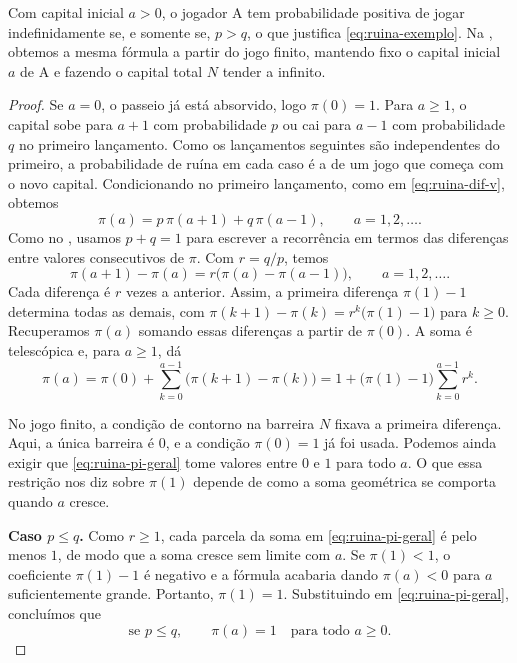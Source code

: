 \documentclass[12pt,portuguese]{article}
\theoremstyle{definition}
\theoremstyle{plainexercise}
\theoremstyle{starredexercise}
\theoremstyle{definition}
\begin{document}
Com capital inicial $a > 0$, o jogador A tem probabilidade positiva de jogar
indefinidamente se, e somente se, $p > q$, o que justifica \eqref{eq:ruina-exemplo}.
Na , obtemos a mesma fórmula a partir do jogo finito,
mantendo fixo o capital inicial $a$ de A e fazendo o capital total $N$ tender
a infinito.

\begin{proof}
  Se $a = 0$, o passeio já está absorvido, logo $\pi(0) = 1$. Para
  $a \geqslant 1$, o capital sobe para $a + 1$ com probabilidade $p$ ou cai
  para $a - 1$ com probabilidade $q$ no primeiro lançamento. Como os
  lançamentos seguintes são independentes do primeiro, a probabilidade de
  ruína em cada caso é a de um jogo que começa com o novo capital.
  Condicionando no primeiro lançamento, como em \eqref{eq:ruina-dif-v}, obtemos
  \[
    \pi(a) = p\,\pi(a + 1) + q\,\pi(a - 1), \qquad a = 1, 2, \ldots.
  \]
  Como no , usamos $p + q = 1$ para escrever
  a recorrência em termos das diferenças entre valores consecutivos de $\pi$.
  Com $r = q/p$, temos
  \[
    \pi(a + 1) - \pi(a) = r\bigl(\pi(a) - \pi(a - 1)\bigr),
    \qquad a = 1, 2, \ldots.
  \]
  Cada diferença é $r$ vezes a anterior. Assim, a primeira diferença
  $\pi(1) - 1$ determina todas as demais, com
  $\pi(k + 1) - \pi(k) = r^k\bigl(\pi(1) - 1\bigr)$ para $k \geqslant 0$.
  Recuperamos $\pi(a)$ somando essas diferenças a partir de $\pi(0)$.
  A soma é telescópica e, para $a \geqslant 1$, dá
  \begin{equation}\label{eq:ruina-pi-geral}
    \pi(a) = \pi(0) + \sum_{k=0}^{a-1} \bigl(\pi(k + 1) - \pi(k)\bigr)
    = 1 + \bigl(\pi(1) - 1\bigr) \sum_{k=0}^{a-1} r^k.
  \end{equation}

  No jogo finito, a condição de contorno na barreira $N$ fixava a primeira
  diferença. Aqui, a única barreira é $0$, e a condição $\pi(0) = 1$ já foi
  usada. Podemos ainda exigir que \eqref{eq:ruina-pi-geral} tome valores entre
  $0$ e $1$ para todo $a$. O que essa restrição nos diz sobre $\pi(1)$ depende
  de como a soma geométrica se comporta quando $a$ cresce.

  \smallskip
  \noindent\textbf{Caso $p \leqslant q$.}
  Como $r \geqslant 1$, cada parcela da soma em \eqref{eq:ruina-pi-geral}
  é pelo menos $1$, de modo que a soma cresce sem limite com $a$. Se
  $\pi(1) < 1$, o coeficiente $\pi(1) - 1$ é negativo e a fórmula acabaria
  dando $\pi(a) < 0$ para $a$ suficientemente grande. Portanto, $\pi(1) = 1$.
  Substituindo em \eqref{eq:ruina-pi-geral}, concluímos que
  \begin{equation}\label{eq:ruina-certa}
    \text{se } p \leqslant q, \qquad \pi(a) = 1 \quad
    \text{para todo } a \geqslant 0.
  \end{equation}


\end{proof}
\end{document}
